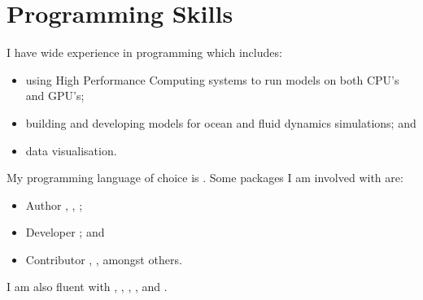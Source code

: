 \section{Programming Skills}

I have wide experience in programming which includes:
\begin{itemize}
    \item[\textbullet] using High Performance Computing systems to run models on both CPU's and GPU's;
    \item[\textbullet] building and developing models for ocean and fluid dynamics simulations; and 
    \item[\textbullet] data visualisation.
\end{itemize}
My programming language of choice is .
Some packages I am involved with are:
\begin{itemize}
    \item[\textbullet] Author , , ;
    \item[\textbullet] Developer ; and
    \item[\textbullet] Contributor , ,  amongst others.
\end{itemize}
I am also fluent with , , , ,  and .
